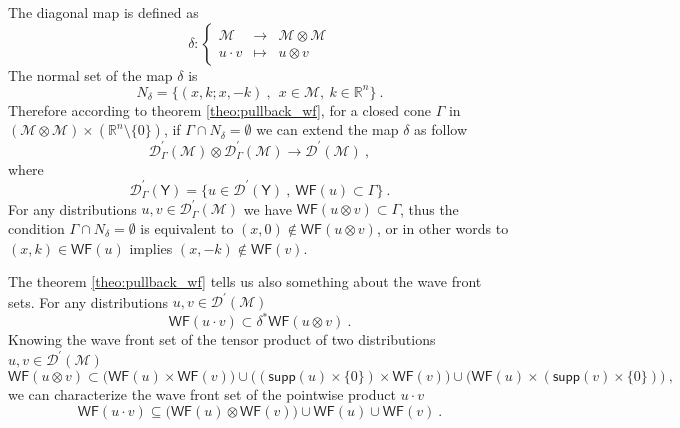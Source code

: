 \documentclass[11pt]{book}
\newcommand{\supp}{\mathsf{supp}}
\newcommand{\WF}{\mathsf{WF}}
\newcommand{\Dcal}{\mathcal{D}}
\newcommand{\Mcal}{\mathcal{M}}
\newcommand{\Rbb}{\mathbb{R}}
\newcommand{\Ysf}{\mathsf{Y}}
\theoremstyle{break}
\begin{document}
The diagonal map is defined as 
%
\begin{equation}
\delta : \left\{
\begin{array}{ccc}
\Mcal & \to & \Mcal \otimes \Mcal \\
u \cdot v & \mapsto & u \otimes v  
\end{array}
\right.
\label{eq:diag_map}
\end{equation}
%
The normal set of the map $\delta$ is 
%
\begin{equation*}
N_\delta = \bigg\{ (x,k;x,-k) \ , \ \ x \in \Mcal , \ k \in \Rbb^n \bigg\} \ .
\end{equation*}
%
Therefore according to theorem \ref{theo:pullback_wf}, for a closed cone $\Gamma$ in $\left(\Mcal \otimes \Mcal\right) \times \left(\Rbb^n \setminus \{0\}\right)$, if $\Gamma \cap N_\delta = \emptyset$ we can extend the map $\delta$ as follow
%
\begin{equation*}
\Dcal^\prime_\Gamma(\Mcal) \otimes \Dcal^\prime_\Gamma(\Mcal) \to \Dcal^\prime(\Mcal) \ ,
\end{equation*}
%
where 
%
\begin{equation*}
\Dcal^\prime_\Gamma(\Ysf) = \bigg\{ u \in \Dcal^\prime(\Ysf) \ , \ \WF(u) \subset \Gamma \bigg\} \ .
\end{equation*}
%
For any distributions $u, v \in\Dcal_\Gamma^\prime(\Mcal)$ we have $\WF(u \otimes v) \subset \Gamma$, thus the condition $\Gamma \cap N_\delta = \emptyset$ is equivalent to $(x,0) \notin \WF(u\otimes v)$, or in other words to $(x,k) \in \WF(u)$ implies $(x,-k) \notin \WF(v)$. 


The theorem \ref{theo:pullback_wf} tells us also something about the wave front sets. For any distributions $u, v \in\Dcal^\prime(\Mcal)$
%
\begin{equation*}
\WF(u \cdot v) \subset \delta^\ast \WF(u \otimes v) \ .
\end{equation*}
%
Knowing the wave front set of the tensor product of two distributions $u, v \in\Dcal^\prime(\Mcal)$ 
%
\begin{equation*}
\WF(u \otimes v) \subset 
\bigg( \WF(u) \times \WF(v) \bigg) 
\cup 
\bigg( \left(\supp(u) \times \{0\} \right) \times \WF(v) \bigg) 
\cup 
\bigg( \WF(u) \times \left( \supp(v) \times \{0\} \right) \bigg) \ ,
\end{equation*}
%
we can characterize the wave front set of the pointwise product $u \cdot v$
%
\begin{equation*}
\WF(u \cdot v) \subseteq \bigg( \WF(u) \otimes \WF(v) \bigg) \cup \WF(u) \cup \WF(v) \ . 
\end{equation*} 
\end{document}
